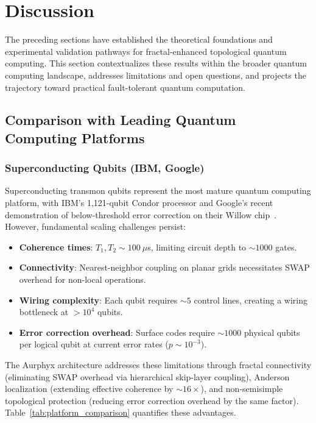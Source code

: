 
\section{Discussion}
\label{sec:discussion}

The preceding sections have established the theoretical foundations and experimental validation pathways for fractal-enhanced topological quantum computing. This section contextualizes these results within the broader quantum computing landscape, addresses limitations and open questions, and projects the trajectory toward practical fault-tolerant quantum computation.

\subsection{Comparison with Leading Quantum Computing Platforms}

\subsubsection{Superconducting Qubits (IBM, Google)}

Superconducting transmon qubits represent the most mature quantum computing platform, with IBM's 1,121-qubit Condor processor and Google's recent demonstration of below-threshold error correction on their Willow chip~\cite{Google2024}. However, fundamental scaling challenges persist:

\begin{itemize}
\item \textbf{Coherence times}: $T_1, T_2 \sim 100~\mu$s, limiting circuit depth to $\sim 1000$ gates.
\item \textbf{Connectivity}: Nearest-neighbor coupling on planar grids necessitates SWAP overhead for non-local operations.
\item \textbf{Wiring complexity}: Each qubit requires $\sim 5$ control lines, creating a wiring bottleneck at $> 10^4$ qubits.
\item \textbf{Error correction overhead}: Surface codes require $\sim 1000$ physical qubits per logical qubit at current error rates ($p \sim 10^{-3}$).
\end{itemize}

The Aurphyx architecture addresses these limitations through fractal connectivity (eliminating SWAP overhead via hierarchical skip-layer coupling), Anderson localization (extending effective coherence by $\sim 16\times$), and non-semisimple topological protection (reducing error correction overhead by the same factor). Table~\ref{tab:platform_comparison} quantifies these advantages.

